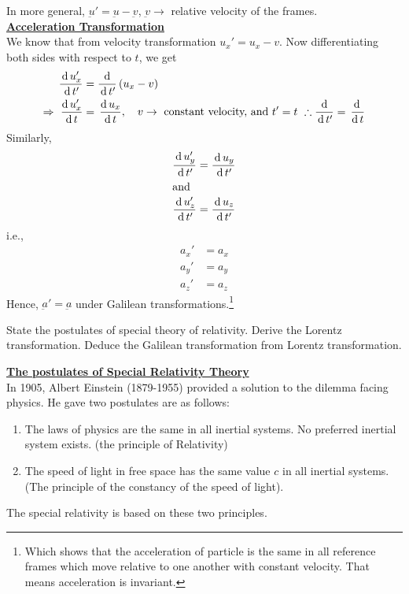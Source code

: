 \documentclass[../main-sheet.tex]{subfiles}
\begin{document}
\begin{soln}
In more general, \(\underbar{u}'=\underbar{u}-\underbar{v}\), \(\underbar{v}\to \) relative velocity of the frames.\\


\underline{\textbf{Acceleration Transformation}}\\
We know that from velocity transformation \(u_x'=u_x-v \). Now differentiating both sides with respect to \(t \), we get
\begin{align*}
    \frac{\,\mathrm{d}\, u_x'}{\,\mathrm{d}\, t'}&=\frac{\,\mathrm{d}\, }{\,\mathrm{d}\, t'}\left( u_x-v \right)\\
    \Rightarrow\,\,\frac{\mathrm{d}\,u_x'}{\mathrm{d}\,t}&=\,\frac{\mathrm{d}\,u_x}{\mathrm{d}\,t},\quad v\to\text{ constant velocity, and }t'=t\,\,\therefore \frac{\,\mathrm{d}\, }{\,\mathrm{d}\, t'}=\,\frac{\mathrm{d}\,}{\mathrm{d}\,t}
\end{align*}
Similarly,
\begin{align*}
    \frac{\,\mathrm{d}\, u_y'}{\,\mathrm{d}\, t'}&=\frac{\,\mathrm{d}\, u_y}{\,\mathrm{d}\, t'}\\
    \intertext{and}
    \frac{\,\mathrm{d}\, u_z'}{\,\mathrm{d}\, t'}&=\frac{\,\mathrm{d}\, u_z}{\,\mathrm{d}\, t'}
\end{align*}
i.e.,
\begin{align*}
    a_x'&=a_x\\
    a_y'&=a_y\\
    a_z'&=a_z
\end{align*}
Hence, \(\underbar{a}'=\underbar{a}\) under Galilean transformations.\footnote{Which shows that the acceleration of particle is the same in all reference frames which move relative to one another with constant velocity. That means acceleration is invariant.}
\end{soln}
\begin{prob}
    State the postulates of special theory of relativity. Derive the Lorentz transformation. Deduce the Galilean transformation from Lorentz transformation.
\end{prob}
\begin{soln}
\underline{\textbf{The postulates of Special Relativity Theory}}\\
In 1905, Albert Einstein (1879-1955) provided a solution to the dilemma facing physics. He gave two postulates are as follows:
\begin{enumerate}
    \item The laws of physics are the same in all inertial systems. No preferred inertial system exists. (the principle of Relativity)
    \item The speed of light in free space has the same value \(c \) in all inertial systems. (The principle of the constancy of the speed of light).
\end{enumerate}
The special relativity is based on these two principles.
\end{soln}
\end{document}
